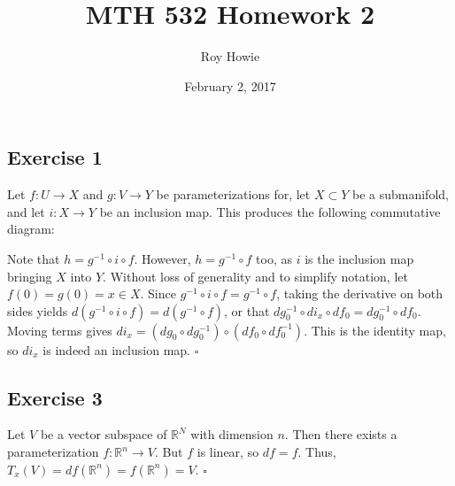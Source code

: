 \documentclass{article}
\begin{document}
\title{MTH 532 Homework 2}
\author{Roy Howie}
\date{February 2, 2017}
\maketitle

\subsection*{Exercise 1}
Let $f\colon U\to X$ and $g\colon V\to Y$ be parameterizations for,
let $X\subset Y$ be a submanifold, and
let $i\colon X\to Y$ be an inclusion map. This produces the following
commutative diagram:

\begin{center}
\end{center}
Note that $h=g^{-1} \circ i \circ f$. However,
$h=g^{-1}\circ f$ too, as $i$ is the inclusion map
bringing $X$ into $Y$.
Without loss of generality and to simplify notation,
let $f(0)=g(0)=x\in X$.
Since $g^{-1} \circ i \circ f = g^{-1}\circ f$, taking
the derivative on both sides yields
$d(g^{-1} \circ i \circ f)=d(g^{-1}\circ f)$,
or that $dg^{-1}_0\circ di_x\circ df_0=dg^{-1}_0\circ df_0$.
Moving terms gives
$di_x=(dg_0\circ dg^{-1}_0)\circ (df_0\circ df^{-1}_0)$.
This is the identity map, so $di_x$ is indeed an inclusion map.
\hfill $\square$

\subsection*{Exercise 3}
Let $V$ be a vector subspace of $\mathbb{R}^N$ with
dimension $n$. Then there exists a parameterization
$f\colon\mathbb{R}^n\to V$. But $f$ is linear, so
$df=f$. Thus, $T_x(V)=df(\mathbb{R}^n)=f(\mathbb{R}^n)=V$.
\hfill $\square$
\end{document}
